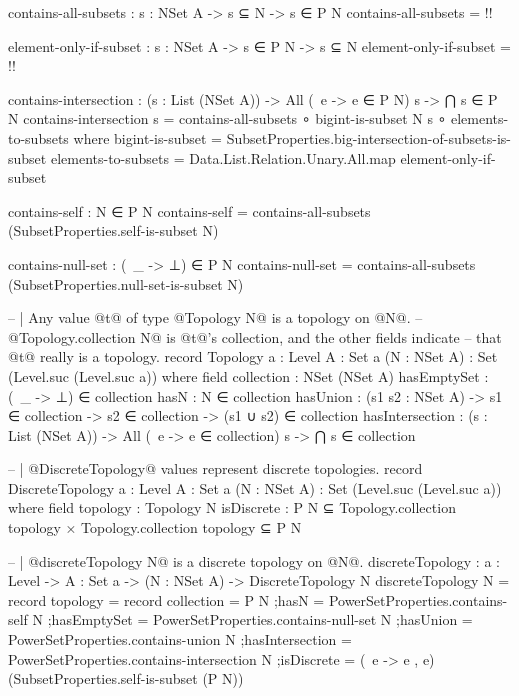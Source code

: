 \begin{code}
  contains-all-subsets : {s : NSet A} -> s ⊆ N -> s ∈ P N
  contains-all-subsets = {!!}

  element-only-if-subset : {s : NSet A} -> s ∈ P N -> s ⊆ N
  element-only-if-subset = {!!}

  contains-intersection : (s : List (NSet A)) ->
                          All (\ e -> e ∈ P N) s ->
                          ⋂ s ∈ P N
  contains-intersection s = contains-all-subsets ∘ bigint-is-subset N s ∘ elements-to-subsets
    where
    bigint-is-subset = SubsetProperties.big-intersection-of-subsets-is-subset
    elements-to-subsets = Data.List.Relation.Unary.All.map element-only-if-subset

  contains-self : N ∈ P N
  contains-self = contains-all-subsets (SubsetProperties.self-is-subset N)

  contains-null-set : (\ _ -> ⊥) ∈ P N
  contains-null-set = contains-all-subsets (SubsetProperties.null-set-is-subset N)

-- | Any value @t@ of type @Topology N@ is a topology on @N@.
-- @Topology.collection N@ is @t@'s collection, and the other fields indicate
-- that @t@ really is a topology.
record Topology {a : Level}
                {A : Set a}
                (N : NSet A) : Set (Level.suc (Level.suc a)) where
  field
    collection : NSet (NSet A)
    hasEmptySet : (\ _ -> ⊥) ∈ collection
    hasN : N ∈ collection
    hasUnion : (s1 s2 : NSet A) ->
               s1 ∈ collection ->
               s2 ∈ collection ->
               (s1 ∪ s2) ∈ collection
    hasIntersection : (s : List (NSet A)) ->
                      All (\ e -> e ∈ collection) s ->
                      ⋂ s ∈ collection

-- | @DiscreteTopology@ values represent discrete topologies.
record DiscreteTopology {a : Level}
                        {A : Set a}
                        (N : NSet A) : Set (Level.suc (Level.suc a)) where
  field
    topology : Topology N
    isDiscrete : P N ⊆ Topology.collection topology ×
                 Topology.collection topology ⊆ P N

-- | @discreteTopology N@ is a discrete topology on @N@.
discreteTopology : {a : Level} -> {A : Set a} -> (N : NSet A) -> DiscreteTopology N
discreteTopology N = record
  {topology = record
     {collection = P N
     ;hasN = PowerSetProperties.contains-self N
     ;hasEmptySet = PowerSetProperties.contains-null-set N
     ;hasUnion = PowerSetProperties.contains-union N
     ;hasIntersection = PowerSetProperties.contains-intersection N
     }
  ;isDiscrete = (\ e -> e , e) (SubsetProperties.self-is-subset (P N))}


\end{code}
